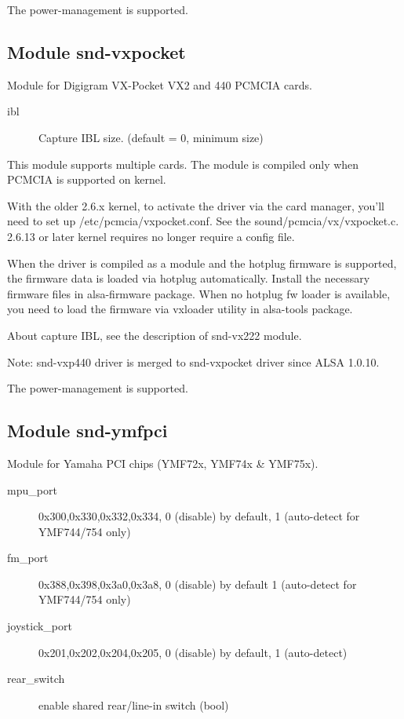 \documentclass[a4paper,8pt,english]{sphinxmanual}
\begin{document}
The power-management is supported.


\subsection{Module snd-vxpocket}
\label{sound/alsa-configuration:module-snd-vxpocket}
Module for Digigram VX-Pocket VX2 and 440 PCMCIA cards.
\begin{description}
\item[{ibl}] \leavevmode
Capture IBL size. (default = 0, minimum size)

\end{description}

This module supports multiple cards.  The module is compiled only when
PCMCIA is supported on kernel.

With the older 2.6.x kernel, to activate the driver via the card
manager, you'll need to set up /etc/pcmcia/vxpocket.conf.  See the
sound/pcmcia/vx/vxpocket.c.  2.6.13 or later kernel requires no
longer require a config file.

When the driver is compiled as a module and the hotplug firmware
is supported, the firmware data is loaded via hotplug automatically.
Install the necessary firmware files in alsa-firmware package.
When no hotplug fw loader is available, you need to load the
firmware via vxloader utility in alsa-tools package.

About capture IBL, see the description of snd-vx222 module.

Note: snd-vxp440 driver is merged to snd-vxpocket driver since
ALSA 1.0.10.

The power-management is supported.


\subsection{Module snd-ymfpci}
\label{sound/alsa-configuration:module-snd-ymfpci}
Module for Yamaha PCI chips (YMF72x, YMF74x \& YMF75x).
\begin{description}
\item[{mpu\_port}] \leavevmode
0x300,0x330,0x332,0x334, 0 (disable) by default,
1 (auto-detect for YMF744/754 only)

\item[{fm\_port}] \leavevmode
0x388,0x398,0x3a0,0x3a8, 0 (disable) by default
1 (auto-detect for YMF744/754 only)

\item[{joystick\_port}] \leavevmode
0x201,0x202,0x204,0x205, 0 (disable) by default,
1 (auto-detect)

\item[{rear\_switch}] \leavevmode
enable shared rear/line-in switch (bool)

\end{description}
\end{document}
